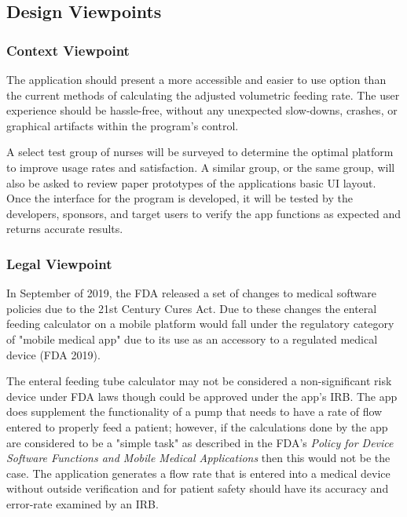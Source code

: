 \documentclass[onecolumn, draftclsnofoot,10pt, compsoc]{IEEEtran}
\begin{document}
\subsection{Design Viewpoints}
\subsubsection{Context Viewpoint}
The application should present a more accessible and easier to use option than the current methods of calculating the adjusted volumetric feeding rate.
The user experience should be hassle-free, without any unexpected slow-downs, crashes, or graphical artifacts within the program's control.

A select test group of nurses will be surveyed to determine the optimal platform to improve usage rates and satisfaction.
A similar group, or the same group, will also be asked to review paper prototypes of the applications basic UI layout.
Once the interface for the program is developed, it will be tested by the developers, sponsors, and target users to verify the app functions as expected and returns accurate results.


\subsubsection{Legal Viewpoint}
In September of 2019, the FDA released a set of changes to medical software policies due to the 21st Century Cures Act.
Due to these changes the enteral feeding calculator on a mobile platform would fall under the regulatory category of "mobile medical app" due to its use as an accessory to a regulated medical device (FDA 2019).

The enteral feeding tube calculator may not be considered a non-significant risk device under FDA laws though could be approved under the app's IRB.
The app does supplement the functionality of a pump that needs to have a rate of flow entered to properly feed a patient; however, if the calculations done by the app are considered to be a "simple task" as described in the FDA's \textit{Policy for Device Software Functions and Mobile Medical Applications} then this would not be the case.
The application generates a flow rate that is entered into a medical device without outside verification and for patient safety should have its accuracy and error-rate examined by an IRB.
\end{document}
